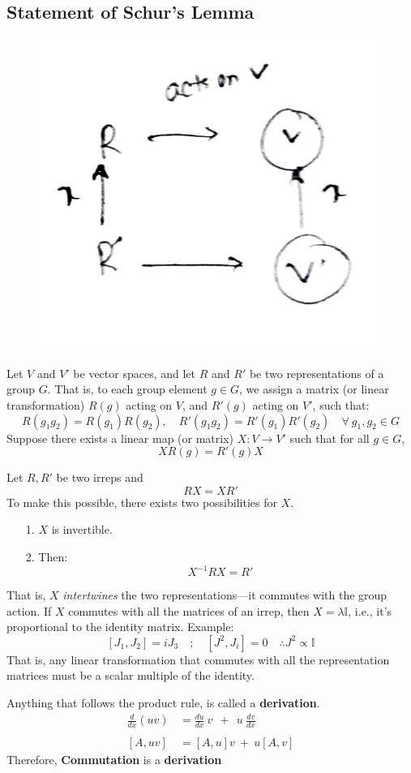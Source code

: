 \documentclass[14pt]{article} %
\begin{document}
\subsection*{Statement of Schur's Lemma}
\vspace{-0.5cm}
\begin{figure}[H]
\centering
\includegraphics[width=0.3\linewidth]{figures/L2_4.jpg}
\caption*{}
\end{figure}
\vspace{-2cm}
Let $V$ and $V'$ be vector spaces, and let $R$ and $R'$ be two representations of a group $G$. That is, to each group element $g \in G$, we assign a matrix (or linear transformation) $R(g)$ acting on $V$, and $R'(g)$ acting on $V'$, such that:
\[
R(g_1 g_2) = R(g_1) R(g_2), \quad R'(g_1 g_2) = R'(g_1) R'(g_2) \quad \forall~ g_1, g_2 \in G
\]
Suppose there exists a linear map (or matrix) $X: V \to V'$ such that for all $g \in G$,
\[
X R(g) = R'(g) X
\]
\begin{tcolorbox}[ title=Intertwiner]
Let $R, R'$ be two irreps and 
$$RX = XR'$$ 
To make this possible, there exists two possibilities for $X$.
\begin{itemize}
    \item[1.] $X$ is invertible.
    \item[2.] Then: $$X^{-1} R X = R'$$
\end{itemize}
\end{tcolorbox}
\noindent
That is, $X$ \textit{intertwines} the two representations—it commutes with the group action.
If $X$ commutes with all the matrices of an irrep, then $X = \lambda \mathbb{I}$, i.e., it's proportional to the identity matrix. Example:
\[
    [J_1, J_2] = i J_3 \quad ;\quad [J^2, J_i] = 0 \quad \therefore J^2 \propto \mathbb{I}
\]
That is, any linear transformation that commutes with all the representation matrices must be a scalar multiple of the identity.
\begin{tcolorbox}[ title=Note: Commutator is a derivative]
Anything that follows the product rule, is called a \textbf{derivation}.
\begin{align*}
    \frac{d}{dx}(uv) &= \frac{du}{dx}~v ~~+~~ u~\frac{dv}{dx} \\ \\
    [A, uv] ~&= [A, u]v ~+~ u[A, v]
\end{align*}
Therefore, \textbf{Commutation} is a \textbf{derivation}
\end{tcolorbox}
\end{document}

